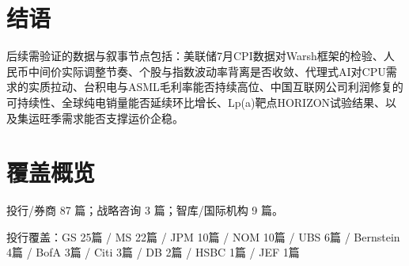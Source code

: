 \documentclass[11pt]{ctexart}
\begin{document}
\section{结语}
后续需验证的数据与叙事节点包括：美联储7月CPI数据对Warsh框架的检验、人民币中间价实际调整节奏、个股与指数波动率背离是否收敛、代理式AI对CPU需求的实质拉动、台积电与ASML毛利率能否持续高位、中国互联网公司利润修复的可持续性、全球纯电销量能否延续环比增长、Lp(a)靶点HORIZON试验结果、以及集运旺季需求能否支撑运价企稳。
\newpage
\section{覆盖概览}
投行/券商 87 篇；战略咨询 3 篇；智库/国际机构 9 篇。\par
投行覆盖：GS 25篇 / MS 22篇 / JPM 10篇 / NOM 10篇 / UBS 6篇 / Bernstein 4篇 / BofA 3篇 / Citi 3篇 / DB 2篇 / HSBC 1篇 / JEF 1篇\par
\end{document}
